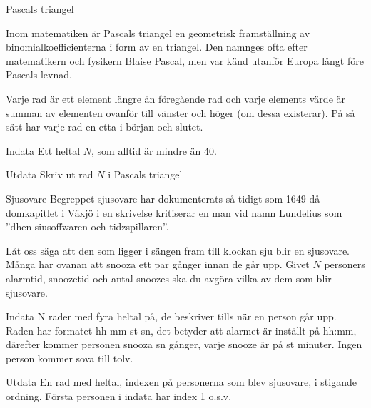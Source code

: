 \documentclass[10pt]{beamer}
\begin{document}
\begin{frame}{Pascals triangel}

Inom matematiken är Pascals triangel en geometrisk framställning av binomialkoefficienterna i form av en triangel. Den namnges ofta efter matematikern och fysikern Blaise Pascal, men var känd utanför Europa långt före Pascals levnad. 

Varje rad är ett element längre än föregående rad och varje elements värde är summan av elementen ovanför till vänster och höger (om dessa existerar). På så sätt har varje rad en etta i början och slutet. 



\begin{exampleblock}{Indata}
Ett heltal $N$, som alltid är mindre än 40.
\end{exampleblock}

\begin{exampleblock}{Utdata}
Skriv ut rad $N$ i Pascals triangel
\end{exampleblock}
\end{frame}



\begin{frame}{Sjusovare}
Begreppet sjusovare har dokumenterats så tidigt som 1649 då domkapitlet i Växjö i en skrivelse kritiserar en man vid namn Lundelius som ''dhen siusoffwaren och tidzspillaren''.

Låt oss säga att den som ligger i sängen fram till klockan sju blir en sjusovare. Många har ovanan att snooza ett par gånger innan de går upp. Givet $N$ personers alarmtid, snoozetid och antal snoozes ska du avgöra vilka av dem som blir sjusovare. 

\begin{exampleblock}{Indata}
N rader med fyra heltal på, de beskriver tills när en person går upp. Raden har formatet hh mm st sn, det betyder att alarmet är inställt på hh:mm, därefter kommer personen snooza sn gånger, varje snooze är på st minuter. Ingen person kommer sova till tolv.
\end{exampleblock}

\begin{exampleblock}{Utdata}
En rad med heltal, indexen på personerna som blev sjusovare, i stigande ordning. Första personen i indata har index 1 o.s.v. 
\end{exampleblock}

\end{frame}
\end{document}
